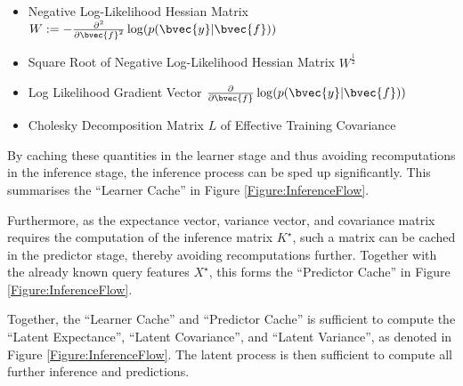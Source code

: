 			\begin{itemize}
				\item Negative Log-Likelihood Hessian Matrix $W := -\frac{\partial^{2}}{{\partial \bvec{f}}^{2}} \log(p(\bvec{y} | \bvec{f}))$
				\item Square Root of Negative Log-Likelihood Hessian Matrix $W^{\frac{1}{2}}$
				\item Log Likelihood Gradient Vector $\frac{\partial}{\partial \bvec{f}} \log(p(\bvec{y} | \bvec{f}))$
				\item Cholesky Decomposition Matrix $L$ of Effective Training Covariance
			\end{itemize}

			By caching these quantities in the learner stage and thus avoiding recomputations in the inference stage, the inference process can be sped up significantly. This summarises the ``Learner Cache'' in Figure \ref{Figure:InferenceFlow}.
			
			Furthermore, as the expectance vector, variance vector, and covariance matrix requires the computation of the inference matrix $K^{\star}$, such a matrix can be cached in the predictor stage, thereby avoiding recomputations further. Together with the already known query features $X^{\star}$, this forms the ``Predictor Cache'' in Figure \ref{Figure:InferenceFlow}.
			
			Together, the ``Learner Cache'' and ``Predictor Cache'' is sufficient to compute the ``Latent Expectance'', ``Latent Covariance'', and ``Latent Variance'', as denoted in Figure \ref{Figure:InferenceFlow}. The latent process is then sufficient to compute all further inference and predictions.
		

		
			
		
		